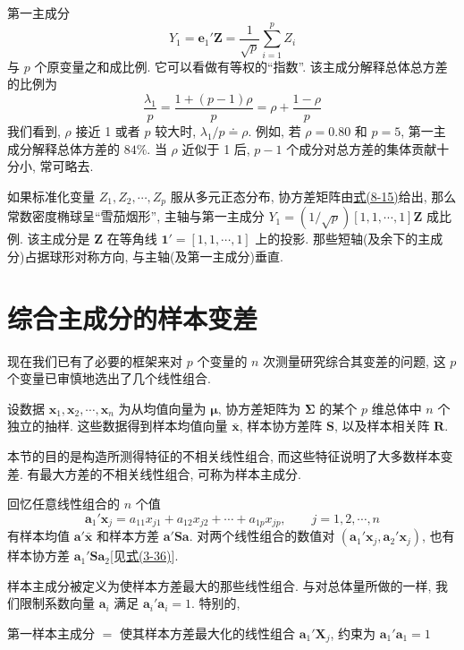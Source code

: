 
第一主成分
\label{eq:8-18}
\begin{equation}
Y_1=\mathbf{e}_1'\mathbf{Z}=\frac{1}{\sqrt{p}}\sum_{i=1}^{p}Z_i
\tag{8-18}
\end{equation}
与 $p$ 个原变量之和成比例. 它可以看做有等权的“指数”. 该主成分解释总体总方差的比例为
\[
\frac{\lambda_1}{p}=\frac{1+(p-1)\rho}{p}=\rho+\frac{1-\rho}{p}
\]
我们看到, $\rho$ 接近 1 或者 $p$ 较大时, $\lambda_1/p\doteq\rho$. 例如, 若 $\rho=0.80$ 和 $p=5$, 第一主成分解释总体方差的 $84\%$. 当 $\rho$ 近似于 1 后, $p-1$ 个成分对总方差的集体贡献十分小, 常可略去.

如果标准化变量 $Z_1,Z_2,\cdots,Z_p$ 服从多元正态分布, 协方差矩阵由\hyperref[eq:8-15]{式(8-15)}给出, 那么常数密度椭球呈“雪茄烟形”, 主轴与第一主成分 $Y_1=(1/\sqrt{p})[1,1,\cdots,1]\mathbf{Z}$ 成比例. 该主成分是 $\mathbf{Z}$ 在等角线 $\mathbf{1}'=[1,1,\cdots,1]$ 上的投影. 那些短轴(及余下的主成分)占据球形对称方向, 与主轴(及第一主成分)垂直.

\section{综合主成分的样本变差}
\label{sec:8.3}

现在我们已有了必要的框架来对 $p$ 个变量的 $n$ 次测量研究综合其变差的问题, 这 $p$ 个变量已审慎地选出了几个线性组合.

设数据 $\mathbf{x}_1,\mathbf{x}_2,\cdots,\mathbf{x}_n$ 为从均值向量为 $\boldsymbol{\mu}$, 协方差矩阵为 $\boldsymbol{\Sigma}$ 的某个 $p$ 维总体中 $n$ 个独立的抽样. 这些数据得到样本均值向量 $\bar{\mathbf{x}}$, 样本协方差阵 $\mathbf{S}$, 以及样本相关阵 $\mathbf{R}$.

本节的目的是构造所测得特征的不相关线性组合, 而这些特征说明了大多数样本变差. 有最大方差的不相关线性组合, 可称为样本主成分.

回忆任意线性组合的 $n$ 个值
\[
\mathbf{a}_1'\mathbf{x}_j=a_{11}x_{j1}+a_{12}x_{j2}+\cdots+a_{1p}x_{jp},\qquad j=1,2,\cdots,n
\]
有样本均值 $\mathbf{a}'\bar{\mathbf{x}}$ 和样本方差 $\mathbf{a}'\mathbf{S}\mathbf{a}$. 对两个线性组合的数值对 $(\mathbf{a}_1'\mathbf{x}_j,\mathbf{a}_2'\mathbf{x}_j)$, 也有样本协方差 $\mathbf{a}_1'\mathbf{S}\mathbf{a}_2$[见\hyperref[eq:3-36]{式(3-36)}].

样本主成分被定义为使样本方差最大的那些线性组合. 与对总体量所做的一样, 我们限制系数向量 $\mathbf{a}_i$ 满足 $\mathbf{a}_i'\mathbf{a}_i=1$. 特别的,

第一样本主成分 $=$ 使其样本方差最大化的线性组合 $\mathbf{a}_1'\mathbf{X}_j$, 约束为 $\mathbf{a}_1'\mathbf{a}_1=1$


